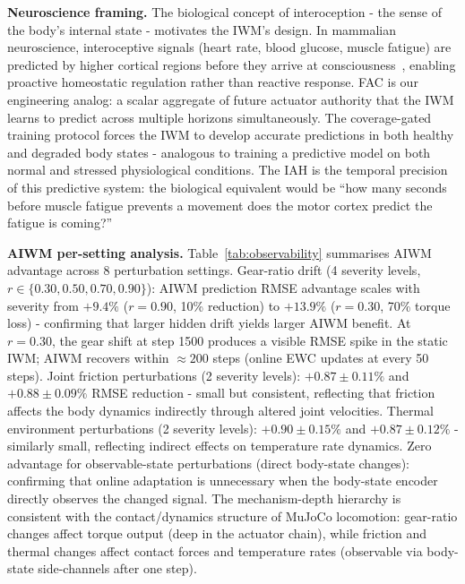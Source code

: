 \documentclass{article}
\begin{document}
{\textbf{Neuroscience framing.}
The biological concept of interoception - the sense of the body's internal state - motivates the IWM's design. In mammalian neuroscience, interoceptive signals (heart rate, blood glucose, muscle fatigue) are predicted by higher cortical regions before they arrive at consciousness~\citep{seth2013interoceptive}, enabling proactive homeostatic regulation rather than reactive response. FAC is our engineering analog: a scalar aggregate of future actuator authority that the IWM learns to predict across multiple horizons simultaneously. The coverage-gated training protocol forces the IWM to develop accurate predictions in both healthy and degraded body states - analogous to training a predictive model on both normal and stressed physiological conditions. The IAH is the temporal precision of this predictive system: the biological equivalent would be ``how many seconds before muscle fatigue prevents a movement does the motor cortex predict the fatigue is coming?''

\textbf{AIWM per-setting analysis.}
Table~\ref{tab:observability} summarises AIWM advantage across 8 perturbation settings. Gear-ratio drift (4 severity levels, $r \in \{0.30, 0.50, 0.70, 0.90\}$): AIWM prediction RMSE advantage scales with severity from $+9.4\%$ ($r=0.90$, 10\% reduction) to $+13.9\%$ ($r=0.30$, 70\% torque loss) - confirming that larger hidden drift yields larger AIWM benefit. At $r=0.30$, the gear shift at step 1500 produces a visible RMSE spike in the static IWM; AIWM recovers within $\approx\!200$ steps (online EWC updates at every 50 steps). Joint friction perturbations (2 severity levels): $+0.87\pm0.11\%$ and $+0.88\pm0.09\%$ RMSE reduction - small but consistent, reflecting that friction affects the body dynamics indirectly through altered joint velocities. Thermal environment perturbations (2 severity levels): $+0.90\pm0.15\%$ and $+0.87\pm0.12\%$ - similarly small, reflecting indirect effects on temperature rate dynamics. Zero advantage for observable-state perturbations (direct body-state changes): confirming that online adaptation is unnecessary when the body-state encoder directly observes the changed signal. The mechanism-depth hierarchy is consistent with the contact/dynamics structure of MuJoCo locomotion: gear-ratio changes affect torque output (deep in the actuator chain), while friction and thermal changes affect contact forces and temperature rates (observable via body-state side-channels after one step).

}
\end{document}
